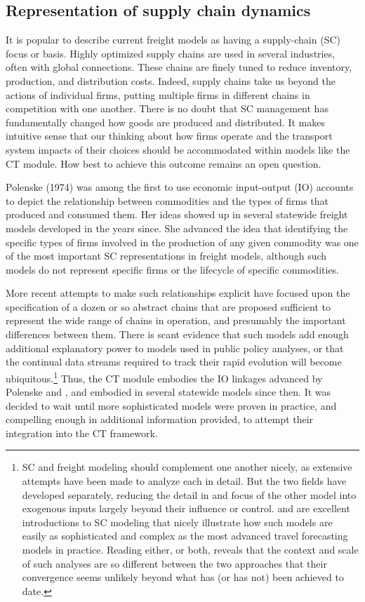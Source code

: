 \subsection{Representation of supply chain dynamics}
It is popular to describe current freight models as having a supply-chain (SC) focus or basis. Highly optimized supply chains are used in several industries, often with global connections. These chains are finely tuned to reduce inventory, production, and distribution costs. Indeed, supply chains take us beyond the actions of individual firms, putting multiple firms in different chains in competition with one another. There is no doubt that SC management has fundamentally changed how goods are produced and distributed. It makes intuitive sense that our thinking about how firms operate and the transport system impacts of their choices should be accommodated within models like the CT module. How best to achieve this outcome remains an open question.

Polenske (1974) was among the first to use economic input-output (IO) accounts to depict the relationship between commodities and the types of firms that produced and consumed them. Her ideas showed up in several statewide freight models developed in the years since. She advanced the idea that identifying the specific types of firms involved in the production of any given commodity was one of the most important SC representations in freight models, although such models do not represent specific firms or the lifecycle of specific commodities.

More recent attempts to make such relationships explicit have focused upon the specification of a dozen or so abstract chains that are proposed sufficient to represent the wide range of chains in operation, and presumably the important differences between them. There is scant evidence that such models add enough additional explanatory power to models used in public policy analyses, or that the continual data streams required to track their rapid evolution will become ubiquitous.\footnote{SC and freight modeling should complement one another nicely, as extensive attempts have been made to analyze each in detail. But the two fields have developed separately, reducing the detail in and focus of the other model into exogenous inputs largely beyond their influence or control. \cite{watson13} and \cite{shapiro06} are excellent introductions to SC modeling that nicely illustrate how such models are easily as sophisticated and complex as the most advanced travel forecasting models in practice. Reading either, or both, reveals that the context and scale of such analyses are so different between the two approaches that their convergence seems unlikely beyond what has (or has not) been achieved to date.} Thus, the CT module embodies the IO linkages advanced by Polenske and \cite{harker87}, and embodied in several statewide models since then. It was decided to wait until more sophisticated models were proven in practice, and compelling enough in additional information provided, to attempt their integration into the CT framework.

